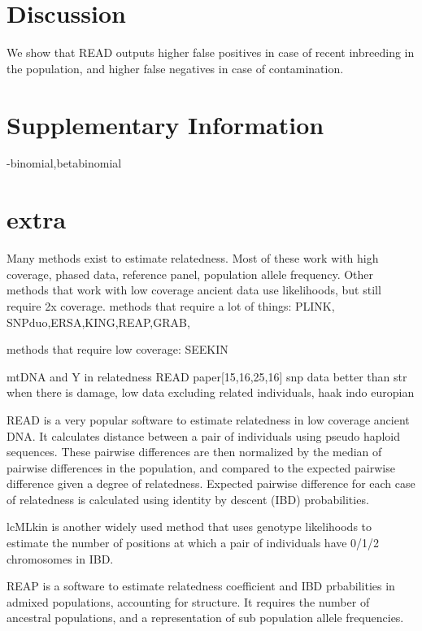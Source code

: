 \documentclass[12pt, letterpaper]{article}
\begin{document}
\section{Discussion}

We show that READ outputs higher false positives in case of recent inbreeding in the population, and higher false negatives in case of contamination. 

\section{Supplementary Information}
-binomial,betabinomial







\section{extra}
Many methods exist to estimate relatedness. Most of these work with high coverage, phased data, reference panel, population allele frequency. Other methods that work with low coverage ancient data use likelihoods, but still require 2x coverage.
methods that require a lot of things: PLINK, SNPduo,ERSA,KING,REAP,GRAB,

methods that require low coverage: SEEKIN

mtDNA and Y in relatedness READ paper[15,16,25,16]
snp data better than str when there is damage, low data
excluding related individuals, haak indo europian

READ is a very popular software to estimate relatedness in low coverage ancient DNA. It calculates distance between a pair of individuals using pseudo haploid sequences. These pairwise differences are then normalized by the median of pairwise differences in the population, and compared to the expected pairwise difference given a degree of relatedness. Expected pairwise difference for each case of relatedness is calculated using identity by descent (IBD) probabilities. 

lcMLkin is another widely used method that uses genotype likelihoods to estimate the number of positions at which a pair of individuals have 0/1/2 chromosomes in IBD.  

REAP is a software to estimate relatedness coefficient and IBD prbabilities in admixed populations, accounting for structure. It requires the number of ancestral populations, and a representation of sub population allele frequencies. 
\end{document}
